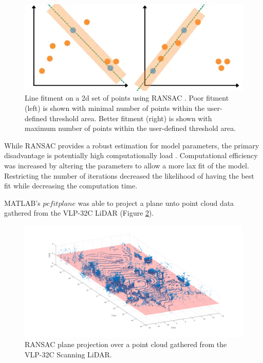 \documentclass[numbered,pdftex]{ohio-etd}
\begin{document}
{{		\begin{figure}[H]
			\centering
			\includegraphics[width=0.7\linewidth]{Defense_Images/RANSAC_good_and_bad.png}
			\caption[2D Simplified RANSAC Example]{Line fitment on a 2d set of points using RANSAC \cite{alam_using_2022}. Poor fitment (left) is shown with minimal number of points within the user-defined threshold area. Better fitment (right) is shown with maximum number of points within the user-defined threshold area.}
			\label{fig:Ransac_2D_Example}
		\end{figure}

		{While RANSAC provides a robust estimation for model parameters, the primary disadvantage is potentially high computationally load \cite{yaniv_random_2010}. Computational efficiency was increased by altering the parameters to allow a more lax fit of the model. Restricting the number of iterations decreased the likelihood of having the best fit while decreasing the computation time.}
	
		{MATLAB's $pcfitplane$ was able to project a plane unto point cloud data gathered from the VLP-32C LiDAR (Figure \ref{fig:RANSAC_example_proj}).}
		
		\begin{figure}[H]
			\centering
			\includegraphics[width=0.7\linewidth]{Defense_Images/RANSAC_example_proj.png}
			\caption[RANSAC Plane Projection Example]{RANSAC plane projection over a point cloud gathered from the VLP-32C Scanning LiDAR.}
			\label{fig:RANSAC_example_proj}
		\end{figure}
		
	} %
	
}
\end{document}
